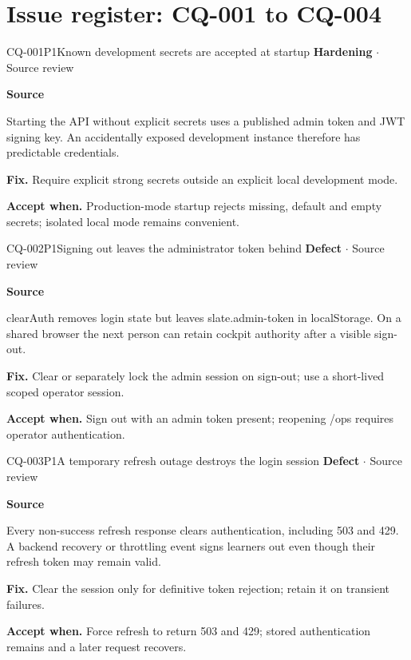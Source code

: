 \clearpage
\section*{Issue register: CQ-001 to CQ-004}
\begin{finding}{CQ-001}{P1}{Known development secrets are accepted at startup}
\textbf{Hardening} $\cdot$ Source review\par
\textbf{Source}\quad{}\par
Starting the API without explicit secrets uses a published admin token and JWT signing key. An accidentally exposed development instance therefore has predictable credentials.\par
\textbf{Fix.} Require explicit strong secrets outside an explicit local development mode.\par
\textbf{Accept when.} Production-mode startup rejects missing, default and empty secrets; isolated local mode remains convenient.
\end{finding}
\begin{finding}{CQ-002}{P1}{Signing out leaves the administrator token behind}
\textbf{Defect} $\cdot$ Source review\par
\textbf{Source}\quad{}\par
clearAuth removes login state but leaves slate.admin-token in localStorage. On a shared browser the next person can retain cockpit authority after a visible sign-out.\par
\textbf{Fix.} Clear or separately lock the admin session on sign-out; use a short-lived scoped operator session.\par
\textbf{Accept when.} Sign out with an admin token present; reopening /ops requires operator authentication.
\end{finding}
\begin{finding}{CQ-003}{P1}{A temporary refresh outage destroys the login session}
\textbf{Defect} $\cdot$ Source review\par
\textbf{Source}\quad{}\par
Every non-success refresh response clears authentication, including 503 and 429. A backend recovery or throttling event signs learners out even though their refresh token may remain valid.\par
\textbf{Fix.} Clear the session only for definitive token rejection; retain it on transient failures.\par
\textbf{Accept when.} Force refresh to return 503 and 429; stored authentication remains and a later request recovers.
\end{finding}
